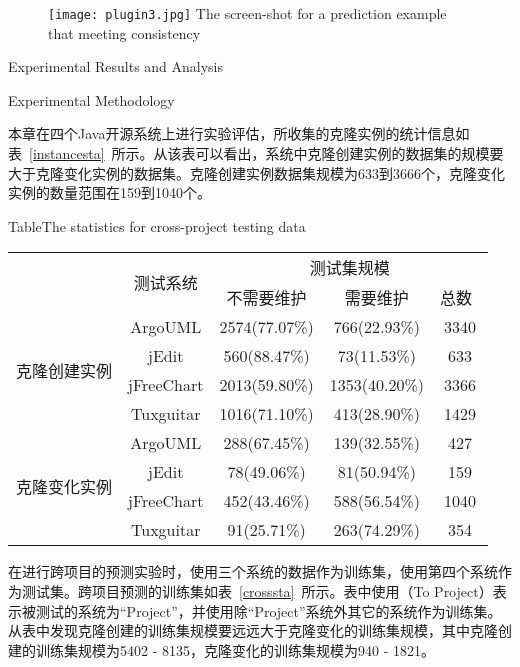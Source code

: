 \begin{figure}[htbp]
\centering
\texttt{[image: plugin3.jpg]}
{The screen-shot for a prediction example that meeting consistency}
\vspace{-1em}
\end{figure}

{Experimental Results and Analysis}

{Experimental Methodology}

本章在四个Java开源系统上进行实验评估，所收集的克隆实例的统计信息如表~\ref{instancesta}~所示。从该表可以看出，系统中克隆创建实例的数据集的规模要大于克隆变化实例的数据集。克隆创建实例数据集规模为633到3666个，克隆变化实例的数量范围在159到1040个。

\begin{table}[h]
{Table$\!$}{The statistics for cross-project testing data}
\vspace{0.5em}
\centering
\wuhao
\begin{tabular}{ccccc}
\toprule[1.5pt]
~\multirow{2}{*}{类型}&\multirow{2}{*}{测试系统}&\multicolumn{3}{c}{测试集规模}\\
\cline{3-5}
~&~&{不需要维护}&{需要维护}&{总数}~\\
\midrule[1pt]
\multirow{4}{*}{克隆创建实例}
&ArgoUML&	2574(77.07\%)&	766(22.93\%)&	3340\\
&jEdit&560(88.47\%)&	73(11.53\%)&	633\\
&jFreeChart&	2013(59.80\%)&	1353(40.20\%)&	3366\\
&Tuxguitar&	1016(71.10\%)&	413(28.90\%)&	1429\\
\hline
\multirow{4}{*}{克隆变化实例}
&ArgoUML&288(67.45\%)&139(32.55\%)&427\\
&jEdit&78(49.06\%)&81(50.94\%)&159\\
&jFreeChart&452(43.46\%)&588(56.54\%)&1040\\
&Tuxguitar&91(25.71\%)&263(74.29\%)&354\\
\bottomrule[1.5pt]
\end{tabular}
\end{table}

在进行跨项目的预测实验时，使用三个系统的数据作为训练集，使用第四个系统作为测试集。跨项目预测的训练集如表~\ref{crosssta}~所示。表中使用（To Project）表示被测试的系统为“Project”，并使用除“Project”系统外其它的系统作为训练集。从表中发现克隆创建的训练集规模要远远大于克隆变化的训练集规模，其中克隆创建的训练集规模为5402 - 8135，克隆变化的训练集规模为940 - 1821。

